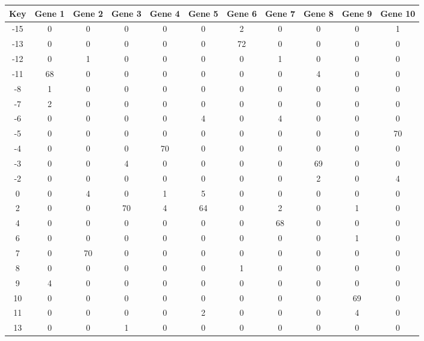 \begin{tabular}{|c|c|c|c|c|c|c|c|c|c|c|}
\hline
Key & Gene 1 & Gene 2 & Gene 3 & Gene 4 & Gene 5 & Gene 6 & Gene 7 & Gene 8 & Gene 9 & Gene 10 \\
\hline
-15 & 0 & 0 & 0 & 0 & 0 & 2 & 0 & 0 & 0 & 1 \\
-13 & 0 & 0 & 0 & 0 & 0 & 72 & 0 & 0 & 0 & 0 \\
-12 & 0 & 1 & 0 & 0 & 0 & 0 & 1 & 0 & 0 & 0 \\
-11 & 68 & 0 & 0 & 0 & 0 & 0 & 0 & 4 & 0 & 0 \\
-8 & 1 & 0 & 0 & 0 & 0 & 0 & 0 & 0 & 0 & 0 \\
-7 & 2 & 0 & 0 & 0 & 0 & 0 & 0 & 0 & 0 & 0 \\
-6 & 0 & 0 & 0 & 0 & 4 & 0 & 4 & 0 & 0 & 0 \\
-5 & 0 & 0 & 0 & 0 & 0 & 0 & 0 & 0 & 0 & 70 \\
-4 & 0 & 0 & 0 & 70 & 0 & 0 & 0 & 0 & 0 & 0 \\
-3 & 0 & 0 & 4 & 0 & 0 & 0 & 0 & 69 & 0 & 0 \\
-2 & 0 & 0 & 0 & 0 & 0 & 0 & 0 & 2 & 0 & 4 \\
0 & 0 & 4 & 0 & 1 & 5 & 0 & 0 & 0 & 0 & 0 \\
2 & 0 & 0 & 70 & 4 & 64 & 0 & 2 & 0 & 1 & 0 \\
4 & 0 & 0 & 0 & 0 & 0 & 0 & 68 & 0 & 0 & 0 \\
6 & 0 & 0 & 0 & 0 & 0 & 0 & 0 & 0 & 1 & 0 \\
7 & 0 & 70 & 0 & 0 & 0 & 0 & 0 & 0 & 0 & 0 \\
8 & 0 & 0 & 0 & 0 & 0 & 1 & 0 & 0 & 0 & 0 \\
9 & 4 & 0 & 0 & 0 & 0 & 0 & 0 & 0 & 0 & 0 \\
10 & 0 & 0 & 0 & 0 & 0 & 0 & 0 & 0 & 69 & 0 \\
11 & 0 & 0 & 0 & 0 & 2 & 0 & 0 & 0 & 4 & 0 \\
13 & 0 & 0 & 1 & 0 & 0 & 0 & 0 & 0 & 0 & 0 \\
\hline
\end{tabular}